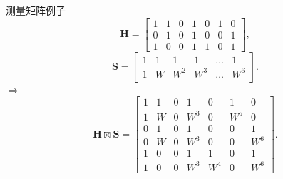 \documentclass{ldr-simple-gray}
\begin{document}
\begin{frame}{测量矩阵例子}
    \begin{equation*}
        \mathbf{H} = 
        \left[
            \begin{array}{ccccccc}
                1 & 1 & 0 & 1 & 0 & 1 & 0 \\
                0 & 1 & 0 & 1 & 0 & 0 & 1 \\
                1 & 0 & 0 & 1 & 1 & 0 & 1
            \end{array}
        \right], 
    \end{equation*}
    \begin{equation*}
        \mathbf{S} = 
        \left[
            \begin{array}{ccccccc}
                1 & 1 & 1  & 1 & \dots & 1 \\
                1 & W & W^2 & W^3 & \dots & W^6
            \end{array}
        \right].
    \end{equation*}
    $\Rightarrow$
    \begin{equation*}
        \mathbf{H} \boxtimes \mathbf{S} = 
        \left[
            \begin{array}{ccccccc}
                1 & 1 & 0 & 1 & 0 & 1 & 0\\
                1 & W & 0 & W^3 & 0 & W^5 & 0\\
                0 & 1 & 0 & 1 & 0 & 0 & 1 \\
                0 & W & 0 & W^3 & 0 & 0 & W^6 \\
                1 & 0 & 0 & 1 & 1 & 0 & 1\\
                1 & 0 & 0 & W^3 & W^4 & 0 & W^6
            \end{array}
        \right].
    \end{equation*}
\end{frame}


\end{document}

